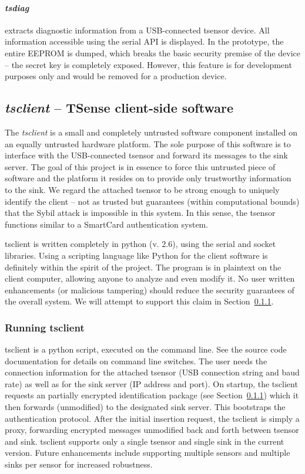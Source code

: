 \paragraph{\textit{tsdiag}} extracts diagnostic information from a USB-connected tsensor device. All information accessible using the serial API is displayed. In the prototype, the entire EEPROM is dumped, which breaks the basic security premise of the device -- the secret key is completely exposed. However, this feature is for development purposes only and would be removed for a production device.

\subsection{\textit{tsclient} -- TSense client-side software}

The \textit{tsclient} is a small and completely untrusted software component installed on an equally untrusted hardware platform. The sole purpose of this software is to interface with the USB-connected tsensor and forward its messages to the sink server. The goal of this project is in essence to force this untrusted piece of software and the platform it resides on to provide only trustworthy information to the sink. 
%
We regard the attached tsensor to be strong enough to uniquely identify the client -- not as trusted but guarantees (within computational bounds) that the Sybil attack  is impossible in this system. In this sense, the tsensor functions similar to a SmartCard authentication system.

tsclient is written completely in python (v. 2.6), using the serial and socket libraries. Using a scripting language like Python for the client software is definitely within the spirit of the project. The program is in plaintext on the client computer, allowing anyone to analyze and even modify it. No user written enhancements (or malicious tampering) should reduce the security guarantees of the overall system. We will attempt to support this claim in Section~\ref{}.

\subsubsection{Running tsclient}

tsclient is a python script, executed on the command line. See the source code documentation for details on command line switches. The user needs the connection information for the attached tsensor (USB connection string and baud rate) as well as for the sink server (IP address and port). On startup, the tsclient requests an partially encrypted identification package (see Section~\ref{}) which it then forwards (unmodified) to the designated sink server. This bootstraps the authentication protocol. After the initial insertion request, the tsclient is simply a proxy, forwarding encrypted messages unmodified back and forth between tsensor and sink. tsclient supports only a single tsensor and single sink in the current version. Future enhancements include supporting multiple sensors and multiple sinks per sensor for increased robustness.

